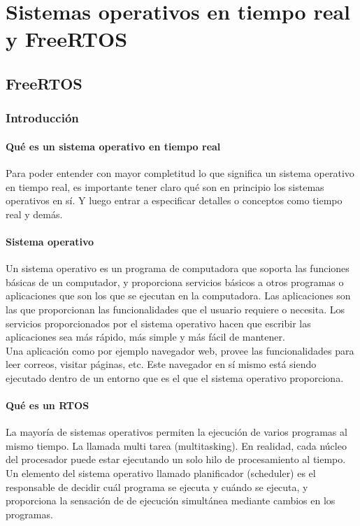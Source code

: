 \chapter{Sistemas operativos en tiempo real y FreeRTOS}


\section{FreeRTOS}
\subsection{Introducción}

\subsubsection{Qué es un sistema operativo en tiempo real}

Para poder entender con mayor completitud lo que significa un sistema operativo en tiempo real, es importante tener claro qué son en principio los sistemas operativos en sí. Y luego entrar a especificar detalles o conceptos como tiempo real y demás.

\subsubsection{Sistema operativo}

Un sistema operativo es un programa de computadora que soporta las funciones básicas de un computador, y proporciona servicios básicos a otros programas o aplicaciones que son los que se ejecutan en la computadora. Las aplicaciones son las que proporcionan las funcionalidades que el usuario requiere o necesita. Los servicios proporcionados por el sistema operativo hacen que escribir las aplicaciones sea más rápido, más simple y más fácil de mantener.\\

Una aplicación como por ejemplo navegador web, provee las funcionalidades para leer correos, visitar páginas, etc. Este navegador en sí mismo está siendo ejecutado dentro de un entorno que es el que el sistema operativo proporciona.

\subsubsection{Qué es un RTOS}

La mayoría de sistemas operativos permiten la ejecución de varios programas al mismo tiempo. La llamada multi tarea (multitasking). En realidad, cada núcleo del procesador puede estar ejecutando un solo hilo de procesamiento al tiempo. Un elemento del sistema operativo llamado planificador (scheduler) es el responsable de decidir cuál programa se ejecuta y cuándo se ejecuta, y proporciona la sensación de de ejecución simultánea mediante cambios en los programas.\\


